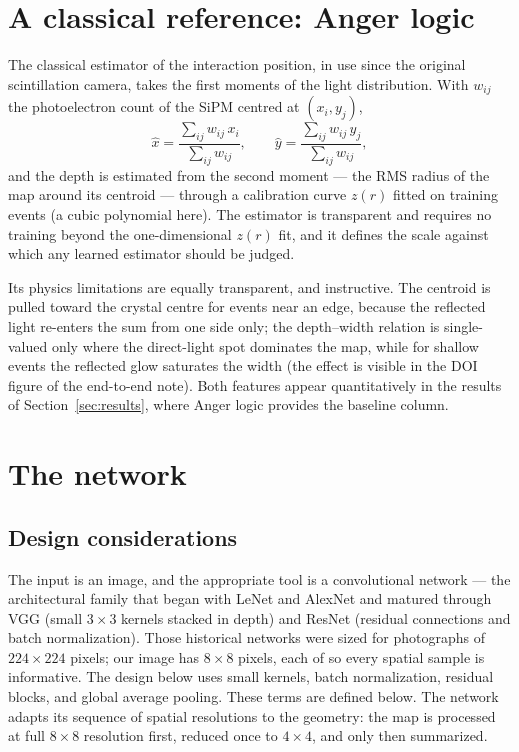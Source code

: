 \documentclass[11pt,a4paper]{article}
\begin{document}
\section{A classical reference: Anger logic}
\label{sec:anger}

The classical estimator of the interaction position, in use since the original
scintillation camera, takes the first moments of the light distribution. With
$w_{ij}$ the photoelectron count of the SiPM centred at $(x_i, y_j)$,
\begin{equation}
  \hat{x} = \frac{\sum_{ij} w_{ij}\, x_i}{\sum_{ij} w_{ij}}, \qquad
  \hat{y} = \frac{\sum_{ij} w_{ij}\, y_j}{\sum_{ij} w_{ij}},
\end{equation}
and the depth is estimated from the second moment --- the RMS radius of the
map around its centroid --- through a calibration curve $z(r)$ fitted on
training events (a cubic polynomial here). The estimator is transparent and
requires no training beyond the one-dimensional $z(r)$ fit, and it defines the
scale against which any learned estimator should be judged.

Its physics limitations are equally transparent, and instructive. The centroid
is pulled toward the crystal centre for events near an edge, because the
reflected light re-enters the sum from one side only; the depth--width relation
is single-valued only where the direct-light spot dominates the map, while for
shallow events the reflected glow saturates the width (the effect is visible in
the DOI figure of the end-to-end note). Both features appear quantitatively in
the results of Section~\ref{sec:results}, where Anger logic provides the
baseline column.

\section{The network}
\label{sec:net}

\subsection{Design considerations}

The input is an image, and the appropriate tool is a convolutional network ---
the architectural family that began with LeNet and AlexNet and matured through
VGG (small $3\times3$ kernels stacked in depth) and ResNet (residual
connections and batch normalization). Those historical networks were sized for
photographs of $224\times224$ pixels; our image has $8\times8$ pixels, each of
so every spatial sample is informative. The design below uses small kernels, batch
normalization, residual blocks, and global average pooling. These terms are defined
below. The network adapts its sequence of spatial resolutions to the geometry: the map is processed at full
$8\times8$ resolution first, reduced once to $4\times4$, and only then
summarized.
\end{document}
